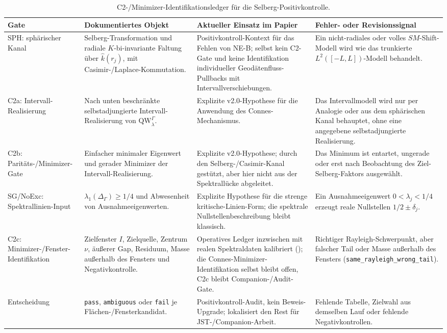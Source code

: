 \documentclass[12pt,a4paper]{article}
\theoremstyle{definition}
\theoremstyle{remark}
\newcommand{\QW}{\mathrm{QW}}
\newcommand{\Delop}{\Delta_{\Gamma}}
\begin{document}
\begin{table}[htp]
\centering
\small
\setlength{\tabcolsep}{3pt}
{\renewcommand{\arraystretch}{1.16}
\begin{tabularx}{\textwidth}{@{}L{0.18\textwidth}YYY@{}}
\toprule
Gate & Dokumentiertes Objekt & Aktueller Einsatz im Papier & Fehler- oder Revisionssignal \\
\midrule
SPH: sphärischer Kanal
  & Selberg-Transformation und radiale \(K\)-bi-invariante Faltung über
    \(\widehat{k}(r_j)\), mit Casimir-/Laplace-Kommutation.
  & Positivkontroll-Kontext für das Fehlen von NE-B; selbst kein C2-Gate und
    keine Identifikation individueller Geodätenfluss-Pullbacks mit
    Intervallverschiebungen.
  & Ein nicht-radiales oder volles \(SM\)-Shift-Modell wird wie das trunkierte
    \(L^2([-L,L])\)-Modell behandelt. \\
C2a: Intervall-Realisierung
  & Nach unten beschränkte selbstadjungierte Intervall-Realisierung von
    \(\QW^\Gamma_\lambda\).
  & Explizite v2.0-Hypothese für die Anwendung des Connes-Mechanismus.
  & Das Intervallmodell wird nur per Analogie oder aus dem sphärischen Kanal
    behauptet, ohne eine angegebene selbstadjungierte Realisierung. \\
C2b: Paritäts-/Minimizer-Gate
  & Einfacher minimaler Eigenwert und gerader Minimizer der
    Intervall-Realisierung.
  & Explizite v2.0-Hypothese; durch den Selberg-/Casimir-Kanal gestützt, aber
    hier nicht aus der Spektrallücke abgeleitet.
  & Das Minimum ist entartet, ungerade oder erst nach Beobachtung des
    Ziel-Selberg-Faktors ausgewählt. \\
SG/NoExc: Spektrallinien-Input
  & \(\lambda_1(\Delop)\ge 1/4\) und Abwesenheit von Ausnahmeeigenwerten.
  & Explizite Hypothese für die strenge kritische-Linien-Form; die spektrale
    Nullstellenbeschreibung bleibt klassisch.
  & Ein Ausnahmeeigenwert \(0<\lambda_j<1/4\) erzeugt reale Nullstellen
    \(1/2\pm\delta_j\). \\
C2c: Minimizer-/Fenster-Identifikation
  & Zielfenster \(I\), Zielquelle, Zentrum \(\nu\), äußerer Gap, Residuum, Masse
    außerhalb des Fensters und Negativkontrolle.
  & Operatives Ledger inzwischen mit realen Spektraldaten kalibriert
    (); die Connes-Minimizer-Identifikation selbst
    bleibt offen, C2c bleibt Companion-/Audit-Gate.
  & Richtiger Rayleigh-Schwerpunkt, aber falscher Tail oder Masse außerhalb des
    Fensters (\texttt{same\_rayleigh\_}\allowbreak\texttt{wrong\_tail}). \\
Entscheidung
  & \texttt{pass}, \texttt{ambiguous} oder \texttt{fail} je
    Flächen-/Fensterkandidat.
  & Positivkontroll-Audit, kein Beweis-Upgrade; lokalisiert den Rest für
    JST-/Companion-Arbeit.
  & Fehlende Tabelle, Zielwahl aus demselben Lauf oder fehlende Negativkontrollen. \\
\bottomrule
\end{tabularx}}
\caption{C2-/Minimizer-Identifikationsledger für die Selberg-Positivkontrolle.}
\label{tab:c2-minimizer-ledger}
\end{table}
\end{document}
